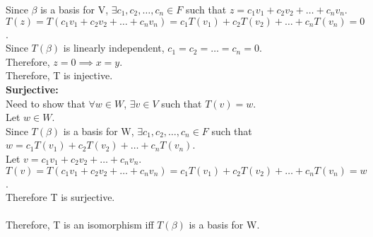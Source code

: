 \documentclass[answers,12pt,addpoints]{exam}
\begin{document}
\begin{questions}
\begin{solution}
        Since $\beta$ is a basis for V, $\exists c_1, c_2, \dots, c_n \in F$ such that $z = c_1v_1 + c_2v_2 + \dots + c_nv_n$.\\
        $T(z) = T(c_1v_1 + c_2v_2 + \dots + c_nv_n) = c_1T(v_1) + c_2T(v_2) + \dots + c_nT(v_n) = 0$.\\
        Since $T(\beta)$ is linearly independent, $c_1 = c_2 = \dots = c_n = 0$.\\
        Therefore, $z = 0 \implies x = y$.\\
        Therefore, T is injective.\\
        \textbf{Surjective:}\\
        Need to show that $\forall w \in W$, $\exists v \in V$ such that $T(v) = w$.\\
        Let $w \in W$.\\
        Since $T(\beta)$ is a basis for W, $\exists c_1, c_2, \dots, c_n \in F$ such that $w = c_1T(v_1) + c_2T(v_2) + \dots + c_nT(v_n)$.\\
        Let $v = c_1v_1 + c_2v_2 + \dots + c_nv_n$.\\
        $T(v) = T(c_1v_1 + c_2v_2 + \dots + c_nv_n) = c_1T(v_1) + c_2T(v_2) + \dots + c_nT(v_n) = w$.\\
        Therefore T is surjective.\\\\
        Therefore, T is an isomorphism iff $T(\beta)$ is a basis for W.
    \end{solution}
    

\end{questions}
\end{document}
